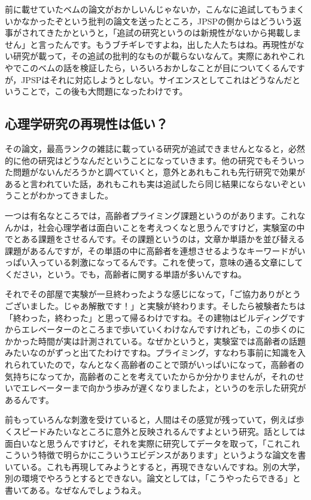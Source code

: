 \documentclass{ltjsbook}
\begin{document}
前に載せていたベムの論文がおかしいんじゃないか，こんなに追試してもうまくいかなかったぞという批判の論文を送ったところ，JPSPの側からはどういう返事がされてきたかというと，「追試の研究というのは新規性がないから掲載しません」と言ったんです。もうブチギレですよね，出した人たちはね。再現性がない研究が載って，その追試の批判的なものが載らないなんて。実際にあれやこれやでこのベムの話を検証したら，いろいろおかしなことが目についてくるんですが，JPSPはそれに対応しようとしない。サイエンスとしてこれはどうなんだということで，この後も大問題になったわけです。

\subsection{心理学研究の再現性は低い？}
その論文，最高ランクの雑誌に載っている研究が追試できませんとなると，必然的に他の研究はどうなんだということになっていきます。他の研究でもそういった問題がないんだろうかと調べていくと，意外とあれもこれも先行研究で効果があると言われていた話，あれもこれも実は追試したら同じ結果にならないぞということがわかってきました。

一つは有名なところでは，高齢者プライミング課題というのがあります\parencite{Bargh1996}。これなんかは，社会心理学者は面白いことを考えつくなと思うんですけど，実験室の中でとある課題をさせるんです。その課題というのは，文章か単語かを並び替える課題があるんですが，その単語の中に高齢者を連想させるようなキーワードがいっぱい入っている刺激になってるんです。これを使って，意味の通る文章にしてください，という。でも，高齢者に関する単語が多いんですね。

それでその部屋で実験が一旦終わったような感じになって，「ご協力ありがとうございました。じゃあ解散です！」と実験が終わります。そしたら被験者たちは「終わった，終わった」と思って帰るわけですね。その建物はビルディングですからエレベーターのところまで歩いていくわけなんですけれども，この歩くのにかかった時間が実は計測されている。なぜかというと，実験室では高齢者の話題みたいなのがずっと出てたわけですね。プライミング，すなわち事前に知識を入れられていたので，なんとなく高齢者のことで頭がいっぱいになって，高齢者の気持ちになってか，高齢者のことを考えていたからか分かりませんが，それのせいでエレベーターまで向かう歩みが遅くなりましたよ，というのを示した研究があるんです。

前もっていろんな刺激を受けていると，人間はその感覚が残っていて，例えば歩くスピードみたいなところに意外と反映されるんですよという研究。話としては面白いなと思うんですけど，それを実際に研究してデータを取って，「これこれこういう特徴で明らかにこういうエビデンスがあります」というような論文を書いている。これも再現してみようとすると，再現できないんですね。別の大学，別の環境でやろうとするとできない。論文としては，「こうやったらできる」と書いてある。なぜなんでしょうねえ。
\end{document}

